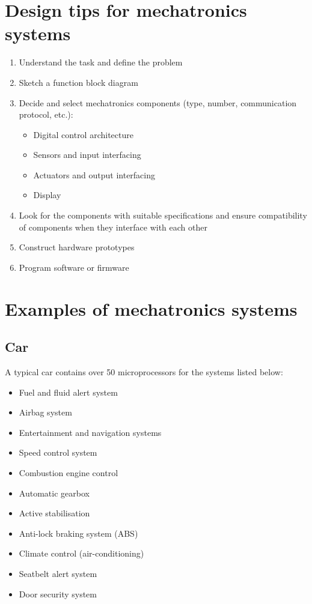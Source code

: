 \documentclass[11pt]{article}
\begin{document}
\section{Design tips for mechatronics systems}
\label{sec:org209f23e}
\begin{enumerate}
\item Understand the task and define the problem
\item Sketch a function block diagram
\item Decide and select mechatronics components (type, number, communication protocol, etc.):
\begin{itemize}
\item Digital control architecture
\item Sensors and input interfacing
\item Actuators and output interfacing
\item Display
\end{itemize}
\item Look for the components with suitable specifications and ensure compatibility of components when they interface with each other
\item Construct hardware prototypes
\item Program software or firmware
\end{enumerate}

\section{Examples of mechatronics systems}
\label{sec:org12e5c74}

\subsection{Car}
\label{sec:org7ff539d}
A typical car contains over 50 microprocessors for the systems listed below:
\begin{itemize}
\item Fuel and fluid alert system
\item Airbag system
\item Entertainment and navigation systems
\item Speed control system
\item Combustion engine control
\item Automatic gearbox
\item Active stabilisation
\item Anti-lock braking system (ABS)
\item Climate control (air-conditioning)
\item Seatbelt alert system
\item Door security system
\end{itemize}
\end{document}
